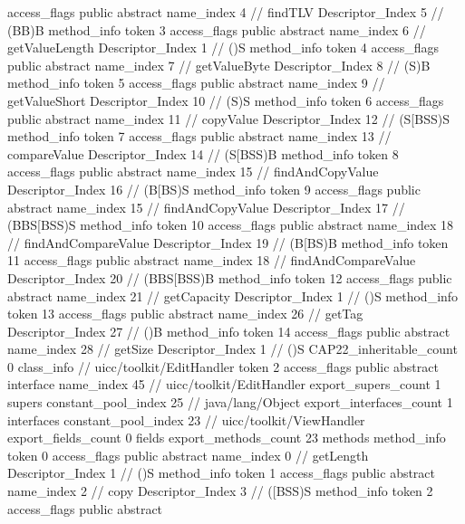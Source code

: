 {{{{{					access_flags	public abstract
					name_index	4		// findTLV
					Descriptor_Index	5		// (BB)B
				}
				method_info {
					token	3
					access_flags	public abstract
					name_index	6		// getValueLength
					Descriptor_Index	1		// ()S
				}
				method_info {
					token	4
					access_flags	public abstract
					name_index	7		// getValueByte
					Descriptor_Index	8		// (S)B
				}
				method_info {
					token	5
					access_flags	public abstract
					name_index	9		// getValueShort
					Descriptor_Index	10		// (S)S
				}
				method_info {
					token	6
					access_flags	public abstract
					name_index	11		// copyValue
					Descriptor_Index	12		// (S[BSS)S
				}
				method_info {
					token	7
					access_flags	public abstract
					name_index	13		// compareValue
					Descriptor_Index	14		// (S[BSS)B
				}
				method_info {
					token	8
					access_flags	public abstract
					name_index	15		// findAndCopyValue
					Descriptor_Index	16		// (B[BS)S
				}
				method_info {
					token	9
					access_flags	public abstract
					name_index	15		// findAndCopyValue
					Descriptor_Index	17		// (BBS[BSS)S
				}
				method_info {
					token	10
					access_flags	public abstract
					name_index	18		// findAndCompareValue
					Descriptor_Index	19		// (B[BS)B
				}
				method_info {
					token	11
					access_flags	public abstract
					name_index	18		// findAndCompareValue
					Descriptor_Index	20		// (BBS[BSS)B
				}
				method_info {
					token	12
					access_flags	public abstract
					name_index	21		// getCapacity
					Descriptor_Index	1		// ()S
				}
				method_info {
					token	13
					access_flags	public abstract
					name_index	26		// getTag
					Descriptor_Index	27		// ()B
				}
				method_info {
					token	14
					access_flags	public abstract
					name_index	28		// getSize
					Descriptor_Index	1		// ()S
				}
			}
			CAP22_inheritable_count	0
		}
		class_info {		// uicc/toolkit/EditHandler
			token	2
			access_flags	public abstract interface
			name_index	45		// uicc/toolkit/EditHandler
			export_supers_count	1
			supers {
				constant_pool_index	25		// java/lang/Object
			}
			export_interfaces_count	1
			interfaces {
				constant_pool_index	23		// uicc/toolkit/ViewHandler
			}
			export_fields_count	0
			fields {
			}
			export_methods_count	23
			methods {
				method_info {
					token	0
					access_flags	public abstract
					name_index	0		// getLength
					Descriptor_Index	1		// ()S
				}
				method_info {
					token	1
					access_flags	public abstract
					name_index	2		// copy
					Descriptor_Index	3		// ([BSS)S
				}
				method_info {
					token	2
					access_flags	public abstract
}}}}}
